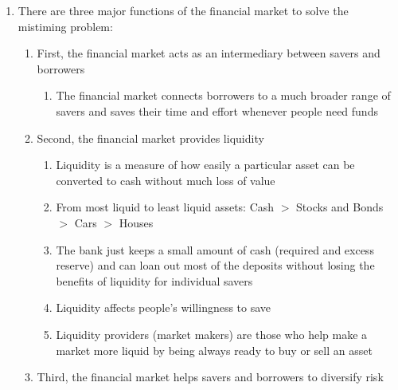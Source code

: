 \documentclass[12pt]{article}
\begin{document}
\begin{enumerate}
\begin{enumerate}
          \item There are three major functions of the financial market to solve the mistiming problem:

            \begin{enumerate}

              \item First, the financial market acts as an intermediary between savers and borrowers

                \begin{enumerate}

                  \item The financial market connects borrowers to a much broader range of savers and saves their time and effort whenever people need funds

                \end{enumerate}

              \item Second, the financial market provides liquidity

                \begin{enumerate}

                  \item Liquidity is a measure of how easily a particular asset can be converted to cash without much loss of value

                  \item From most liquid to least liquid assets: Cash $>$ Stocks and Bonds $>$ Cars $>$ Houses

                  \item The bank just keeps a small amount of cash (required and excess reserve) and can loan out most of the deposits without losing the benefits of liquidity for individual savers

                  \item Liquidity affects people's willingness to save

                  \item Liquidity providers (market makers) are those who help make a market more liquid by being always ready to buy or sell an asset

                \end{enumerate}

              \item Third, the financial market helps savers and borrowers to diversify risk

                \begin{enumerate}


\end{enumerate}
\end{enumerate}
\end{enumerate}
\end{enumerate}
\end{document}
